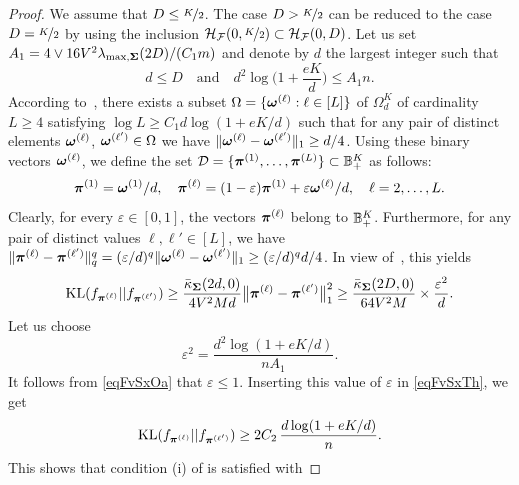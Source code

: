 \begin{proof}
	We assume that $D \leq \nicefrac{K}2$. The case $D> \nicefrac{K}2$ can be reduced to the
	case $D = \nicefrac{K}2$ by using the inclusion $\mathcal H_\mathcal F(0,\nicefrac{K}2)\subset \mathcal H_\mathcal F(0,D)$. Let us set $A_1 = 4\vee {16 V^2\lambda_{\max,\boldsymbol\Sigma}(2D)}/{(C_1 m)}$ 
	and denote by $d$ the largest integer such that
	\begin{equation}\label{eqFvSxOa}
	d\le D\quad\text{and}\quad d^2\log\Big(1+\frac{e  K}{d}\Big)\le A_1 n.
	\end{equation}
	According to~, there exists a subset
	$\Omega = \{\boldsymbol \omega^{(\ell)}:\ell\in[L]\}$ of  $\Omega_{d}^{K}$ of cardinality $L\ge 4$
	satisfying $\log L\geq {C_1 d}\log(1+{eK}/{d})$ such that for any pair of distinct 
	elements $\boldsymbol \omega^{(\ell)}$, $\boldsymbol \omega^{(\ell')}\in \Omega$ we have
	$\|\boldsymbol \omega^{(\ell)}-\boldsymbol \omega^{(\ell')}\|_1 \geq d/4$. Using these binary vectors $\boldsymbol \omega^{(\ell)}$, we define the set $\mathcal{D} =
	\{ \boldsymbol \pi^{(1)},\dots,\boldsymbol \pi^{(L)}\}\subset {\mathbb B}_+^{K}$ as follows:
	\begin{equation}\label{eqFvSxTw}
	\boldsymbol \pi^{(1)}=\boldsymbol \omega^{(1)}/d,\quad
	\boldsymbol \pi^{(\ell)}=(1-\varepsilon)\boldsymbol \pi^{(1)}+\varepsilon \boldsymbol \omega^{(\ell)}/d,\quad \ell=2,\ldots,L.
	\end{equation}
	Clearly, for every $\varepsilon\in[0,1]$, the vectors $\boldsymbol \pi^{(\ell)}$ belong to  ${\mathbb B}^K_+$.
	Furthermore, for any pair of distinct
	values $\ell,\ell'\in[L]$, we have $\|\boldsymbol \pi^{(\ell)}-\boldsymbol \pi^{(\ell')}\|_q^q = (\varepsilon/d)^q
	\|\boldsymbol \omega^{(\ell)}-\boldsymbol \omega^{(\ell')}\|_1\ge (\varepsilon/d)^qd/4$.  In view of~,
	this yields
	\begin{equation}\label{eqFvSxTh}
	{\rm KL}(f_{\boldsymbol \pi^{(\ell)}}||f_{\boldsymbol \pi^{(\ell')}})
	\geq \frac{\bar\kappa_{\boldsymbol\Sigma}(2d,0)}{4V^2M d} \big{\|}\boldsymbol \pi^{(\ell)} - \boldsymbol \pi^{(\ell')}\big{\|}_1^2
	\geq \frac{\bar\kappa_{\boldsymbol\Sigma}(2D,0)}{64V^2M}\times\frac{\varepsilon^2}{d}.
	\end{equation}
	Let us choose
	\begin{equation}
	\varepsilon^2 = \frac{d^2 \log(1+e  K/d)}{n A_1}.
	\end{equation}
	It follows from \eqref{eqFvSxOa} that $\varepsilon\le 1$. Inserting this value of
	$\varepsilon$ in \eqref{eqFvSxTh}, we get
	\begin{equation}
	{\rm KL}(f_{\boldsymbol \pi^{(\ell)}}||f_{\boldsymbol \pi^{(\ell')}}) \geq 2 C_2\,\frac{d\log(1+e  K/d)}{n}.
	\end{equation}
	This shows that condition (i) of  is satisfied with

\end{proof}
